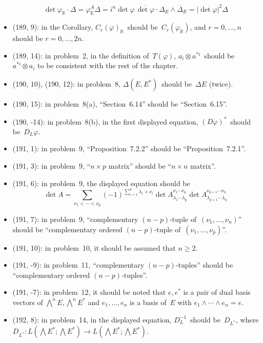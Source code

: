 \documentclass[letterpaper,12pt]{article}
\newcommand{\R}{\mathbb{R}}
\newcommand{\mult}{\cdot}
\newcommand{\tprod}{\otimes}
\newcommand{\eprod}{\wedge}
\newcommand{\bigeprod}{\bigwedge}
\newcommand{\abs}[1]{|#1|}
\newcommand{\conj}[1]{\overline{#1}}
\begin{document}
\begin{itemize}
\[\det\varphi_{\R}\mult\Delta=\varphi_{\R}^A\Delta=i^n\det\varphi\,\conj{\det\varphi}\mult\Delta_E\eprod\conj{\Delta}_E=\abs{\det\varphi}^2\Delta\]
\item (189, 9): in the Corollary, \(C_r(\varphi)_{\R}\)~should be~\(C_r(\varphi_{\R})\), and \(r=0,\ldots,n\) should be \(r=0,\ldots,2n\).
\item (189, 14): in problem~2, in the definition of~\(T(\varphi)\), \(a_i\tprod a^{*i}\)~should be~\(a^{*i}\tprod a_i\) to be consistent with the rest of the chapter.
\item (190, 10), (190, 12): in problem~8, \(\Delta(E,E^*)\)~should be~\(\Delta E\) (twice).
\item (190, 15): in problem~8(a), ``Section~6.14'' should be ``Section~6.15''.
\item (190, -14): in problem~8(b), in the first displayed equation, \((D\varphi)^*\)~should be~\(D_L\varphi\).
\item (191, 1): in problem~9, ``Proposition~7.2.2'' should be ``Proposition~7.2.1''.
\item (191, 3): in problem~9, ``\(n\times p\) matrix'' should be ``\(n\times n\) matrix''.
\item (191, 6): in problem~9, the displayed equation should be
\[\det A=\sum_{\nu_1<\cdots<\nu_p}(-1)^{\sum_{i=1}^p\lambda_i+\nu_i}\det A_{\lambda_1\cdots\lambda_p}^{\nu_1\cdots\nu_p}\det A_{\lambda_{p+1}\cdots\lambda_n}^{\nu_{p+1}\cdots\nu_n}\]
\item (191, 7): in problem~9, ``complementary \((n-p)\)-tuple of~\((\nu_1,\ldots,\nu_n)\)'' should be ``complementary ordered \((n-p)\)-tuple of~\((\nu_1,\ldots,\nu_p)\)''.
\item (191, 10): in problem~10, it should be assumed that \(n\ge 2\).
\item (191, -9): in problem~11, ``complementary \((n-p)\)-tuples'' should be ``complementary ordered \((n-p)\)-tuples''.
\item (191, -7): in problem~12, it should be noted that \(e,e^*\) is a pair of dual basis vectors of \(\bigeprod^n E,\bigeprod^n E^*\) and \(e_1,\ldots,e_n\) is a basis of~\(E\) with \(e_1\eprod\cdots\eprod e_n=e\).
\item (192, 8): in problem~14, in the displayed equation, \(D_L^{-1}\)~should be~\(D_{L^*}\), where \(D_{L^*}:L(\bigeprod E^*;\bigeprod E^*)\to L(\bigeprod E^*;\bigeprod E^*)\).
\end{itemize}
\end{document}
